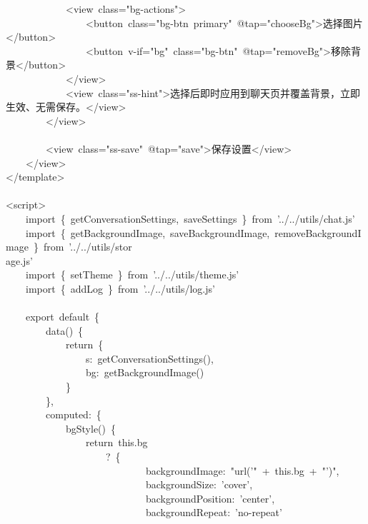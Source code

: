 \documentclass[a4paper,10pt]{article}
\begin{document}
{\ttfamily\footnotesize\raggedright
~~~~~~~~~~~~<view~class="bg-actions">\\
~~~~~~~~~~~~~~~~<button~class="bg-btn~primary"~@tap="chooseBg">选择图片</button>\\
~~~~~~~~~~~~~~~~<button~v-if="bg"~class="bg-btn"~@tap="removeBg">移除背景</button>\\
~~~~~~~~~~~~</view>\\
~~~~~~~~~~~~<view~class="ss-hint">选择后即时应用到聊天页并覆盖背景，立即生效、无需保存。</view>\\
~~~~~~~~</view>\\
\mbox{}\\
~~~~~~~~<view~class="ss-save"~@tap="save">保存设置</view>\\
~~~~</view>\\
</template>\\
\mbox{}\\
<script>\\
~~~~import~\{~getConversationSettings,~saveSettings~\}~from~'../../utils/chat.js'\\
~~~~import~\{~getBackgroundImage,~saveBackgroundImage,~removeBackgroundImage~\}~from~'../../utils/stor\\
age.js'\\
~~~~import~\{~setTheme~\}~from~'../../utils/theme.js'\\
~~~~import~\{~addLog~\}~from~'../../utils/log.js'\\
\mbox{}\\
~~~~export~default~\{\\
~~~~~~~~data()~\{\\
~~~~~~~~~~~~return~\{\\
~~~~~~~~~~~~~~~~s:~getConversationSettings(),\\
~~~~~~~~~~~~~~~~bg:~getBackgroundImage()\\
~~~~~~~~~~~~\}\\
~~~~~~~~\},\\
~~~~~~~~computed:~\{\\
~~~~~~~~~~~~bgStyle()~\{\\
~~~~~~~~~~~~~~~~return~this.bg\\
~~~~~~~~~~~~~~~~~~~~?~\{\\
~~~~~~~~~~~~~~~~~~~~~~~~~~~~backgroundImage:~"url('"~+~this.bg~+~"')",\\
~~~~~~~~~~~~~~~~~~~~~~~~~~~~backgroundSize:~'cover',\\
~~~~~~~~~~~~~~~~~~~~~~~~~~~~backgroundPosition:~'center',\\
~~~~~~~~~~~~~~~~~~~~~~~~~~~~backgroundRepeat:~'no-repeat'\\
}
\end{document}
